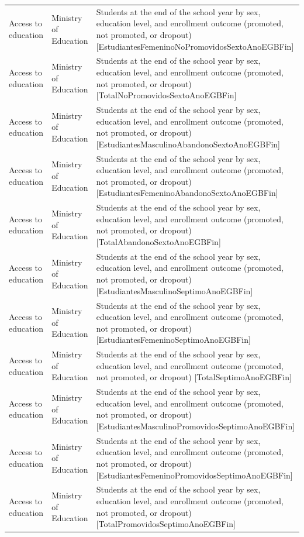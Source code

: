\documentclass[10pt,a4paper]{article}
\begin{document}
\begin{longtable}{@{}>{\raggedright\arraybackslash}p{3.5cm}>{\raggedright\arraybackslash}p{5.6cm}>{\raggedright\arraybackslash}p{\dimexpr\textwidth-9.1cm-4\tabcolsep\relax}@{}}
Access to education & Ministry of Education & Students at the end of the school year by sex, education level, and enrollment outcome (promoted, not promoted, or dropout) [EstudiantesFemeninoNoPromovidosSextoAnoEGBFin]\\
Access to education & Ministry of Education & Students at the end of the school year by sex, education level, and enrollment outcome (promoted, not promoted, or dropout) [TotalNoPromovidosSextoAnoEGBFin]\\
Access to education & Ministry of Education & Students at the end of the school year by sex, education level, and enrollment outcome (promoted, not promoted, or dropout) [EstudiantesMasculinoAbandonoSextoAnoEGBFin]\\
Access to education & Ministry of Education & Students at the end of the school year by sex, education level, and enrollment outcome (promoted, not promoted, or dropout) [EstudiantesFemeninoAbandonoSextoAnoEGBFin]\\
Access to education & Ministry of Education & Students at the end of the school year by sex, education level, and enrollment outcome (promoted, not promoted, or dropout) [TotalAbandonoSextoAnoEGBFin]\\
Access to education & Ministry of Education & Students at the end of the school year by sex, education level, and enrollment outcome (promoted, not promoted, or dropout) [EstudiantesMasculinoSeptimoAnoEGBFin]\\
Access to education & Ministry of Education & Students at the end of the school year by sex, education level, and enrollment outcome (promoted, not promoted, or dropout) [EstudiantesFemeninoSeptimoAnoEGBFin]\\
Access to education & Ministry of Education & Students at the end of the school year by sex, education level, and enrollment outcome (promoted, not promoted, or dropout) [TotalSeptimoAnoEGBFin]\\
Access to education & Ministry of Education & Students at the end of the school year by sex, education level, and enrollment outcome (promoted, not promoted, or dropout) [EstudiantesMasculinoPromovidosSeptimoAnoEGBFin]\\
Access to education & Ministry of Education & Students at the end of the school year by sex, education level, and enrollment outcome (promoted, not promoted, or dropout) [EstudiantesFemeninoPromovidosSeptimoAnoEGBFin]\\
Access to education & Ministry of Education & Students at the end of the school year by sex, education level, and enrollment outcome (promoted, not promoted, or dropout) [TotalPromovidosSeptimoAnoEGBFin]\\

\end{longtable}
\end{document}
